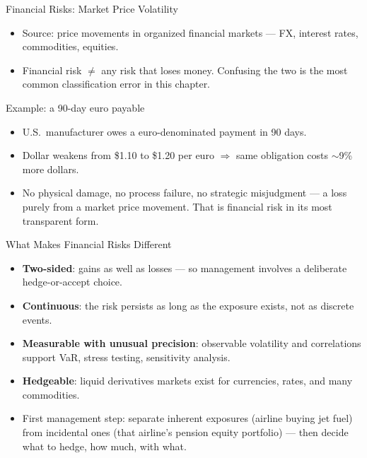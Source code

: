 \documentclass[11pt, aspectratio=169]{beamer}
\begin{document}
\begin{frame}{Financial Risks: Market Price Volatility}
\begin{itemize}
  \item Source: price movements in organized financial markets --- FX, interest rates, commodities, equities.
  \item \alert{Financial risk $\neq$ any risk that loses money.} Confusing the two is the most common classification error in this chapter.
\end{itemize}
\medskip
\begin{exampleblock}{Example: a 90-day euro payable}
\begin{itemize}
  \item U.S.\ manufacturer owes a euro-denominated payment in 90 days.
  \item Dollar weakens from \$1.10 to \$1.20 per euro $\Rightarrow$ same obligation costs $\sim$9\% more dollars.
  \item No physical damage, no process failure, no strategic misjudgment --- a loss purely from a market price movement. That is financial risk in its most transparent form.
\end{itemize}
\end{exampleblock}
\end{frame}

\begin{frame}{What Makes Financial Risks Different}
\begin{itemize}
  \item \textbf{Two-sided}: gains as well as losses --- so management involves a deliberate hedge-or-accept choice.
  \item \textbf{Continuous}: the risk persists as long as the exposure exists, not as discrete events.
  \item \textbf{Measurable with unusual precision}: observable volatility and correlations support VaR, stress testing, sensitivity analysis.
  \item \textbf{Hedgeable}: liquid derivatives markets exist for currencies, rates, and many commodities.
  \item First management step: separate \alert{inherent} exposures (airline buying jet fuel) from \alert{incidental} ones (that airline's pension equity portfolio) --- then decide what to hedge, how much, with what.
\end{itemize}
\end{frame}
\end{document}
